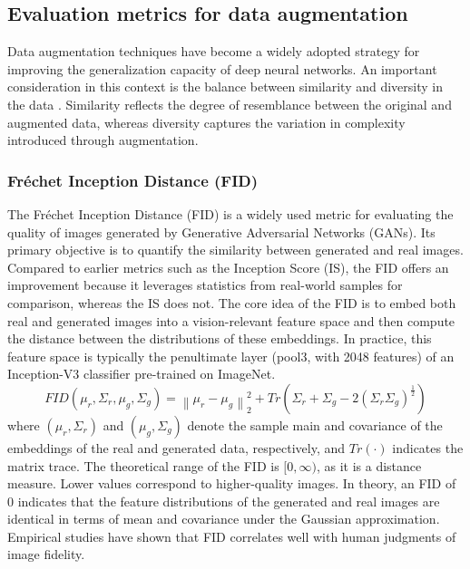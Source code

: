 \documentclass[journal]{IEEEtran}
\begin{document}
\subsection{Evaluation metrics for data augmentation}
Data augmentation techniques have become a widely adopted strategy for improving the generalization capacity of deep neural networks. An important consideration in this context is the balance between similarity and diversity in the data \cite{yang2024investigating}. Similarity reflects the degree of resemblance between the original and augmented data, whereas diversity captures the variation in complexity introduced through augmentation.


\subsubsection{Fréchet Inception Distance (FID)}
The Fréchet Inception Distance (FID) is a widely used metric for evaluating the quality of images generated by Generative Adversarial Networks (GANs)\cite{guven2024image}. Its primary objective is to quantify the similarity between generated and real images\cite{heusel2017gans}. Compared to earlier metrics such as the Inception Score (IS), the FID offers an improvement because it leverages statistics from real-world samples for comparison, whereas the IS does not\cite{kynkäänniemi2023roleimagenetclassesfrechet}.
The core idea of the FID is to embed both real and generated images into a vision-relevant feature space and then compute the distance between the distributions of these embeddings. In practice, this feature space is typically the penultimate layer (pool3, with 2048 features) of an Inception-V3 classifier pre-trained on ImageNet\cite{kynkäänniemi2023roleimagenetclassesfrechet}.
\[FID(\mu_r,\Sigma_r,\mu_g,\Sigma_g )=\left\|\mu_r-\mu_g \right\|_2^2+Tr(\Sigma_r+\Sigma_g-2(\Sigma_r \Sigma_g)^{\frac{1}{2}})\]
where $(\mu_r,\Sigma_r)$ and $(\mu_g,\Sigma_g)$ denote the sample main and covariance of the embeddings of the real and generated data, respectively, and $Tr(\cdot)$ indicates the matrix trace\cite{kynkäänniemi2023roleimagenetclassesfrechet}.
The theoretical range of the FID is $[0, \infty)$, as it is a distance measure. Lower values correspond to higher-quality images\cite{wang2019improvingmmdgantrainingrepulsive}. In theory, an FID of 0 indicates that the feature distributions of the generated and real images are identical in terms of mean and covariance under the Gaussian approximation\cite{heusel2017gans}.
Empirical studies have shown that FID correlates well with human judgments of image fidelity\cite{heusel2017gans}. 
\end{document}
